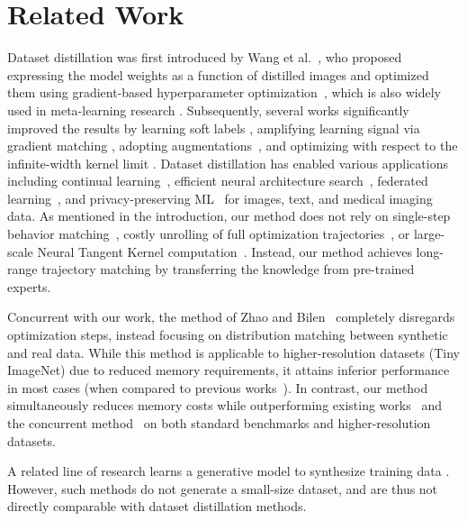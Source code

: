 \section{Related Work}



Dataset distillation was first introduced by Wang et al.~\cite{dd}, who proposed expressing the model weights as a function of distilled images and optimized them using gradient-based hyperparameter optimization~\cite{maclaurin2015gradient}, which is also widely used in meta-learning research \citep{finn2017model,nichol2018first}. %
Subsequently, several works significantly improved the results by learning soft labels \cite{bohdal2020flexible,sucholutsky2021soft}, amplifying learning signal via gradient matching \cite{dc}, adopting augmentations~\cite{dsa}, and optimizing with respect to the infinite-width kernel limit \cite{nguyen2020dataset,nguyen2021dataset}. Dataset distillation has enabled various applications including continual learning~\cite{dd,dc,dsa}, efficient neural architecture search~\cite{dc,dsa}, federated learning~\cite{goetz2020federated,zhou2020distilled,sucholutsky2020secdd}, and privacy-preserving ML~\cite{sucholutsky2020secdd,li2020soft} for images, text, and medical imaging data. As mentioned in the introduction, our method does not rely on single-step behavior matching~\cite{dc,dsa},  costly unrolling of full optimization trajectories~\cite{dd,sucholutsky2021soft}, or large-scale Neural Tangent Kernel computation~\cite{nguyen2020dataset,nguyen2021dataset}. Instead, our method achieves long-range trajectory matching by transferring the knowledge from pre-trained experts. %


Concurrent with our work, the method of Zhao and Bilen~\cite{dm} completely disregards optimization steps, instead focusing on distribution matching between synthetic and real data. While this method is applicable to higher-resolution datasets (\eg Tiny ImageNet) due to reduced memory requirements, it attains inferior performance in most cases (\eg when compared to previous works~\cite{dc,dsa}). In contrast, our method simultaneously reduces memory costs while outperforming existing works~\cite{dc,dsa} and the concurrent method~\cite{dm} on both standard benchmarks and higher-resolution datasets. 

A related line of research learns a generative model to synthesize training data \cite{such2020generative,masarczyk2020reducing}. However, such methods do not generate a small-size dataset, and are thus not directly comparable with dataset distillation methods.



